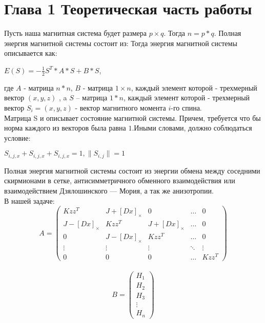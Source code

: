 \documentclass[ 12pt,x11names]{article}
\begin{document}
    \newpage
    \section{Глава 1 Теоретическая часть работы}
    Пусть наша магнитная система будет размера $p \times  q$. Тогда $n =  p * q$.
    Полная энергия магнитной системы состоит из:
    Тогда энергия магнитной системы описывается как:
    \begin{center}
    $E(S) = - \frac{1}{2}S^T*A*S + B*S$,
    \end{center}
    где $A$ - матрица $n * n$, $B$ - матрица $1 \times n$,
    каждый элемент которой - трехмерный вектор $(x, y, z)$
    , a $S$ -- матрица $1*n$, каждый элемент которой - трехмерный вектор $S_i = (x, y, z)$ - вектор магнитного момента $i$-го спина. \\
    Матрица S и описывает состояние магнитной системы.
    Причем, требуется что бы норма каждого из векторов была равна $1$.Иными словами, должно соблюдаться условие:\\
     \begin{center}
     $S_{i, j, x} + S_{i, j, x} + S_{i, j, x} = 1, \|S_{i, j}\| = 1$\\
    \end{center}
    Полная энергия магнитной системы состоит из энергии обмена между соседними скирмионами в сетке,  антисимметричного обменного взаимодействия или взаимодействием Дзялошинского — Мория, а так же анизотропии.\\
    В нашей задаче:
    \begin{equation*}
    A = \left(
    \begin{array}{ccccс}
    Kzz^T & J + [Dx]_\times & 0  & \ldots & 0\\
    J - [Dx]_\times & Kzz^T & J + [Dx]_\times &\ldots & 0\\
    0 & J - [Dx]_\times & Kzz^T &\ldots & 0\\
    \vdots &\vdots &\vdots &\ddots & \vdots\\
    0 & 0 &  0 &\ldots & Kzz^T
    \end{array}
    \right)
    \end{equation*}\\
     \begin{equation*}
    B = \left(
    \begin{array}{c}
    H_1\\
    H_2\\
    H_3\\
    \vdots\\
    H_n
    \end{array}
    \right)
    \end{equation*}\\
\end{document}

